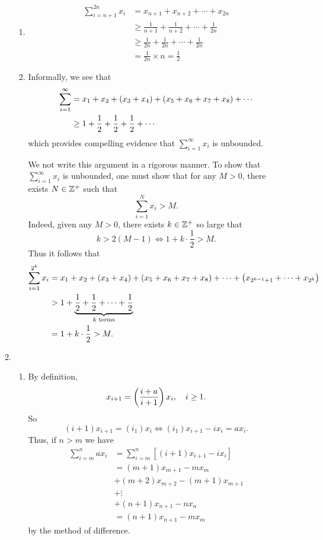 \begin{enumerate}
\begin{solution}
\begin{enumerate}[label=(\roman*)]
\begin{enumerate}[label=(\alph*)]
\item 
\begin{align*}
\sum_{i=n+1}^{2n}x_i&=x_{n+1}+x_{n+2}+\cdots+x_{2n}\\
&\ge\frac{1}{n+1}+\frac{1}{n+2}+\cdots+\frac{1}{2n}\\
&\ge\frac{1}{2n}+\frac{1}{2n}+\cdots+\frac{1}{2n}\\
&=\frac{1}{2n}\times n=\frac{1}{2}
\end{align*}

\item Informally, we see that
\begin{align*}
\sum_{i=1}^\infty&=x_1+x_2+\left(x_3+x_4\right)+\left(x_5+x_6+x_7+x_8\right)+\cdots\\
&\ge1+\frac{1}{2}+\frac{1}{2}+\frac{1}{2}+\cdots
\end{align*}
which provides compelling evidence that $\sum_{i=1}^\infty x_i$ is unbounded.

We not write this argument in a rigorous manner. To show that $\sum_{i=1}^\infty x_i$ is unbounded, one must show that for any $M>0$, there exists $N\in\mathbb Z^+$ such that
\[ \sum_{i=1}^Nx_i>M. \]
Indeed, given any $M>0$, there exists $k\in\mathbb Z^+$ so large that
\[ k>2(M-1) \iff 1+k\cdot\frac{1}{2}>M. \]
Thus it follows that
\begin{align*}
\sum_{i=1}^{2^k}x_i&=x_1+x_2+\left(x_3+x_4\right)+\left(x_5+x_6+x_7+x_8\right)+\cdots+\left(x_{2^{k-1}+1}+\cdots+x_{2^k}\right)\\
&>1+\underbrace{\frac{1}{2}+\frac{1}{2}+\cdots+\frac{1}{2}}_{k\text{ terms}}\\
&=1+k\cdot\frac{1}{2}>M.
\end{align*}
\end{enumerate}

\item \begin{enumerate}[label=(\alph*)]
\item By definition, 
\[ x_{i+1}=\left(\frac{i+a}{i+1}\right)x_i, \quad i\ge1. \]
So
\[ (i+1)x_{i+1}=(i_1)x_i \iff (i_1)x_{i+1}-ix_i=ax_i. \]
Thus, if $n>m$ we have
\begin{align*}
\sum_{i=m}^n ax_i
&=\sum_{i=m}^n[(i+1)x_{i+1}-ix_i]\\
&=(m+1)x_{m+1}-mx_m\\
&+(m+2)x_{m+2}-(m+1)x_{m+1}\\
&+\vdots\\
&+(n+1)x_{n+1}-nx_n\\
&=(n+1)x_{n+1}-mx_m
\end{align*}
by the method of difference.


\end{enumerate}
\end{enumerate}
\end{solution}
\end{enumerate}
